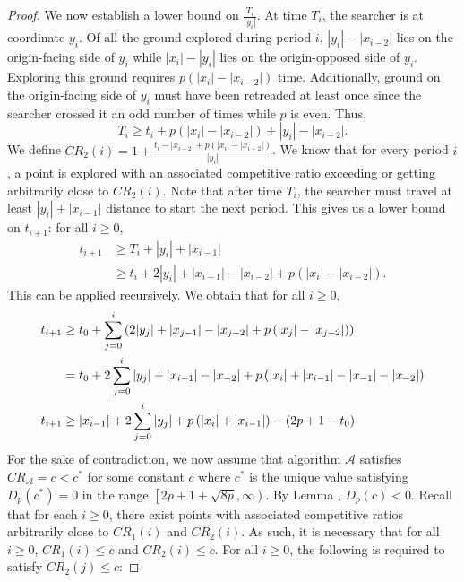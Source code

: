 \begin{appendixonly}
\begin{proof}
  We now establish a lower bound on $\frac{T_i}{|y_i|}$. At time $T_i$, the searcher is at coordinate $y_i$. Of all the ground explored during period $i$, $|y_i|-|x_{i-2}|$ lies on the origin-facing side of $y_i$ while $|x_i|-|y_i|$ lies on the origin-opposed side of $y_i$. Exploring this ground requires $p\left(|x_i|-|x_{i-2}|\right)$ time. Additionally, ground on the origin-facing side of $y_i$ must have been retreaded at least once since the searcher crossed it an odd number of times while $p$ is even. Thus,
  \begin{equation*}
    T_i \geq t_i + p\left(|x_i|-|x_{i-2}|\right) + |y_i| - |x_{i-2}| .
  \end{equation*}
  We define $CR_2(i) = 1 + \frac{t_i-|x_{i-2}| + p\left(|x_i|-|x_{i-2}|\right)}{|y_i|}$. We know that for every period $i$, a point is explored with an associated competitive ratio exceeding or getting arbitrarily close to $CR_2(i)$. Note that after time $T_i$, the searcher must travel at least $|y_i| + |x_{i-1}|$ distance to start the next period. This gives us a lower bound on $t_{i+1}$: for all $i\geq 0$,
  \begin{align}
    t_{i+1} &\geq T_i + |y_i| + |x_{i-1}| \nonumber\\
    &\geq t_i + 2|y_i| + |x_{i-1}|-|x_{i-2}| + p\left(|x_i|-|x_{i-2}|\right) .\nonumber
  \end{align}
  This can be applied recursively. We obtain that for all $i\geq 0$,
  \begin{align}
    t_{i+1} &\geq t_0 + \sum_{j=0}^{i}\left(2|y_j|+ |x_{j-1}|-|x_{j-2}|+p\left(|x_j|-|x_{j-2}|\right)\right) \nonumber\\
    &= t_0 + 2\sum_{j=0}^{i}|y_j| + |x_{i-1}|-|x_{-2}| + p\left(|x_i|+|x_{i-1}|-|x_{-1}|-|x_{-2}|\right) \nonumber\\
    t_{i+1} &\geq |x_{i-1}| + 2\sum_{j=0}^{i}|y_j| + p\left(|x_i|+|x_{i-1}|\right) - (2p+1-t_0)  \mylabel{eq:ti_bound}
  \end{align}
  For the sake of contradiction, we now assume that algorithm $\mathcal{A}$ satisfies $CR_{\mathcal{A}}=c<c^*$ for some constant $c$ where $c^*$ is the unique value satisfying $D_p(c^*)=0$ in the range $\left[2p+1+\sqrt{8p},\infty\right)$. By Lemma , $D_p(c)<0$. Recall that for each $i\geq 0$, there exist points with associated competitive ratios arbitrarily close to $CR_1(i)$ and $CR_2(i)$. As such, it is necessary that for all $i\geq 0$, $CR_1(i)\leq c$ and $CR_2(i)\leq c$. For all $i\geq 0$, the following is required to satisfy $CR_2(j)\leq c$:

\end{proof}
\end{appendixonly}
